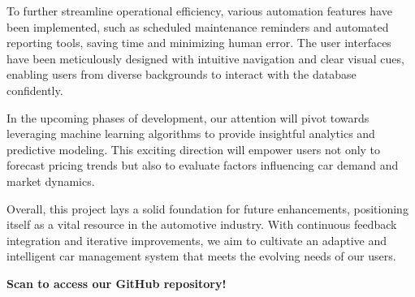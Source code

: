\documentclass[12pt]{report}
\begin{document}
To further streamline operational efficiency, various automation features have been implemented, such as scheduled maintenance reminders and automated reporting tools, saving time and minimizing human error. The user interfaces have been meticulously designed with intuitive navigation and clear visual cues, enabling users from diverse backgrounds to interact with the database confidently.

In the upcoming phases of development, our attention will pivot towards leveraging machine learning algorithms to provide insightful analytics and predictive modeling. This exciting direction will empower users not only to forecast pricing trends but also to evaluate factors influencing car demand and market dynamics. 

Overall, this project lays a solid foundation for future enhancements, positioning itself as a vital resource in the automotive industry. With continuous feedback integration and iterative improvements, we aim to cultivate an adaptive and intelligent car management system that meets the evolving needs of our users.



\begin{center}  
    \vspace{20pt}  
    \textbf{Scan to access our GitHub repository!}  
\end{center}  
\end{document}
